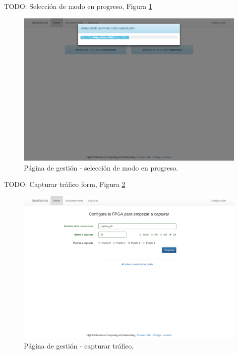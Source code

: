 TODO: Selección de modo en progreso, Figura \ref{fig:captura:gestionprogreso}
\begin{figure}[H]
  \centering
  \includegraphics[width=\textwidth,clip=true]{graphics/capturas/gestor_seleccion_progreso}
  \caption{Página de gestión - selección de modo en progreso.}
  \label{fig:captura:gestionprogreso}
\end{figure}

TODO: Capturar tráfico form, Figura \ref{fig:captura:gestioncapturar}
\begin{figure}[H]
  \centering
  \includegraphics[width=\textwidth,clip=true]{graphics/capturas/gestor_capturar}
  \caption{Página de gestión - capturar tráfico.}
  \label{fig:captura:gestioncapturar}
\end{figure}

